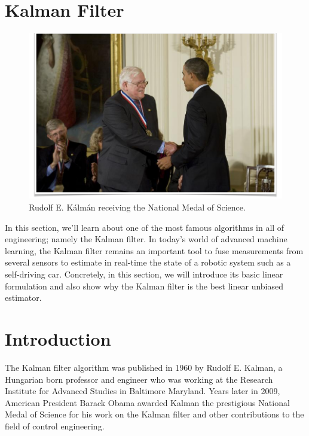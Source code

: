 \section{Kalman Filter}
\label{kalman_filters}

\begin{figure}[!htb]
\begin{center}
\includegraphics[scale=0.280]{img/kalman_filter/rudolf_e_kalman.jpeg}
\end{center}
\caption{Rudolf E. Kálmán receiving the National Medal of Science.}
\label{rudolf_e_kalman}
\end{figure}


In this section, we'll learn about one of the most famous algorithms in all of engineering; namely the Kalman filter. In today's world of
advanced machine learning, the Kalman filter remains
an important tool to fuse measurements from several sensors to estimate in real-time the state of a robotic system such
as a self-driving car. Concretely, in this section, we will introduce its basic linear formulation and also show  why the Kalman filter is the best linear unbiased
estimator. 

\section{Introduction}
\label{kalman_filter_introduction}

The Kalman filter algorithm was
published in 1960 by Rudolf E. Kalman, a Hungarian born professor
and engineer who was working at the Research Institute
for Advanced Studies in Baltimore Maryland. Years later in 2009, American President Barack
Obama awarded Kalman the prestigious National Medal
of Science for his work on the Kalman filter and other contributions to the field
of control engineering.

